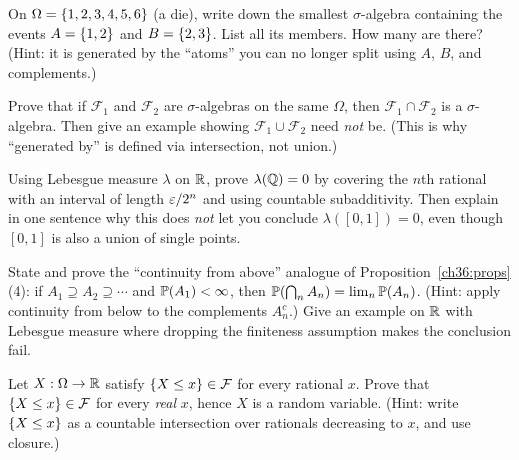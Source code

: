 \begin{exercise}
\label{ch36:ex-generated}
On $\Omega = \set{1,2,3,4,5,6}$ (a die), write down the smallest
$\sigma$-algebra containing the events $A = \set{1,2}$ and $B = \set{2,3}$. List
all its members. How many are there? (Hint: it is generated by the ``atoms'' you
can no longer split using $A$, $B$, and complements.)
\end{exercise}

\begin{exercise}
\label{ch36:ex-intersection}
Prove that if $\mathcal{F}_1$ and $\mathcal{F}_2$ are $\sigma$-algebras on the same
$\Omega$, then $\mathcal{F}_1 \cap \mathcal{F}_2$ is a $\sigma$-algebra. Then give
an example showing $\mathcal{F}_1 \cup \mathcal{F}_2$ need \emph{not} be. (This is
why ``generated by'' is defined via intersection, not union.)
\end{exercise}

\begin{exercise}
\label{ch36:ex-null}
Using Lebesgue measure $\lambda$ on $\R$, prove $\lambda(\Q) = 0$ by covering the
$n$th rational with an interval of length $\eps / 2^n$ and using countable
subadditivity. Then explain in one sentence why this does \emph{not} let you
conclude $\lambda([0,1]) = 0$, even though $[0,1]$ is also a union of single
points.
\end{exercise}

\begin{exercise}
\label{ch36:ex-cont-above}
State and prove the ``continuity from above'' analogue of
Proposition~\ref{ch36:props}(4): if $A_1 \supseteq A_2 \supseteq \cdots$ and
$\P(A_1) < \infty$, then $\P\!\left(\bigcap_n A_n\right) = \lim_n \P(A_n)$.
(Hint: apply continuity from below to the complements $A_n^c$.) Give an example on
$\R$ with Lebesgue measure where dropping the finiteness assumption makes the
conclusion fail.
\end{exercise}

\begin{exercise}
\label{ch36:ex-measurable}
Let $X : \Omega \to \R$ satisfy $\set{X \le x} \in \mathcal{F}$ for every rational
$x$. Prove that $\set{X \le x} \in \mathcal{F}$ for every \emph{real} $x$, hence
$X$ is a random variable. (Hint: write $\set{X \le x}$ as a countable
intersection over rationals decreasing to $x$, and use closure.)
\end{exercise}

